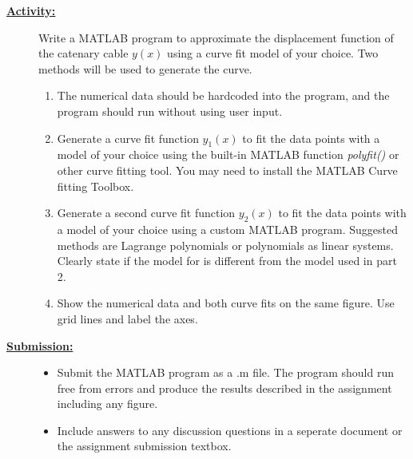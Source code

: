 \documentclass[12pt]{article}
\newcommand{\ANUM}{7} %
\begin{document}
\begin{description}
\item[\textbf{\underline{Activity:}}] \hfill \vspace{0mm}

Write a MATLAB program to approximate the displacement function of the catenary cable $y(x)$ using a curve fit model of your choice. Two methods will be used to generate the curve.

\begin{enumerate}	
	
	\item The numerical data should be hardcoded into the program, and the program should run without using user input. 

	\item Generate a curve fit function $y_1(x)$ to fit the data points with a model of your choice using the built-in MATLAB function {\it polyfit()} or other curve fitting tool. You may need to install the MATLAB Curve fitting Toolbox. 

	\item Generate a second curve fit function $y_2(x)$ to fit the data points with a model of your choice using a custom MATLAB program. Suggested methods are Lagrange polynomials or polynomials as linear systems. Clearly state if the model for is different from the model used in part 2.

	\item Show the numerical data and both curve fits on the same figure. Use grid lines and label the axes.

\end{enumerate}

\newpage	



\item[\textbf{\underline{Submission:}}] \hfill \vspace{0mm}

	\begin{itemize}

		\item Submit the MATLAB program as a .m file. The program should run free from errors and produce the results described in the assignment including any figure. 

		\item Include answers to any discussion questions in a seperate document or the assignment submission textbox. 

	\end{itemize}		



\end{description}
\end{document}
